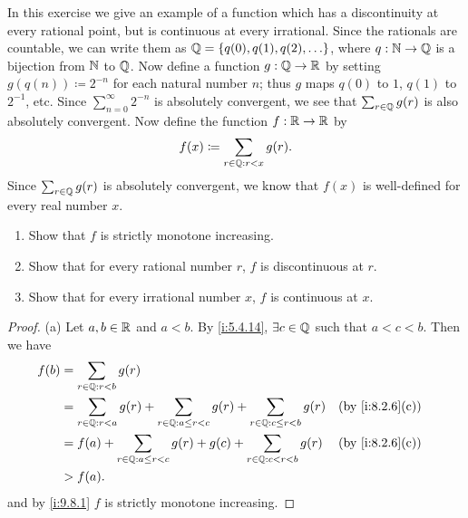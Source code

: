 \begin{ex}\label{i:ex:9.8.5}
  In this exercise we give an example of a function which has a discontinuity at every rational point, but is continuous at every irrational.
  Since the rationals are countable, we can write them as \(\Q = \set{q(0), q(1), q(2), \dots}\), where \(q : \mathbb{N} \to \mathbb{Q}\) is a bijection from \(\mathbb{N}\) to \(\mathbb{Q}\).
  Now define a function \(g : \mathbb{Q} \to \mathbb{R}\) by setting \(g(q(n)) \coloneqq 2^{-n}\) for each natural number \(n\);
  thus \(g\) maps \(q(0)\) to \(1\), \(q(1)\) to \(2^{-1}\), etc.
  Since \(\sum_{n = 0}^\infty 2^{-n}\) is absolutely convergent, we see that \(\sum_{r \in \mathbb{Q}} g(r)\) is also absolutely convergent.
  Now define the function \(f : \mathbb{R} \to \mathbb{R}\) by
  \[
    f(x) \coloneqq \sum_{r \in \mathbb{Q} : r < x} g(r).
  \]
  Since \(\sum_{r \in \mathbb{Q}} g(r)\) is absolutely convergent, we know that \(f(x)\) is well-defined for every real number \(x\).
  \begin{enumerate}
    \item Show that \(f\) is strictly monotone increasing.
    \item Show that for every rational number \(r\), \(f\) is discontinuous at \(r\).
    \item Show that for every irrational number \(x\), \(f\) is continuous at \(x\).
  \end{enumerate}
\end{ex}

\begin{proof}{(a)}
  Let \(a, b \in \mathbb{R}\) and \(a < b\).
  By \cref{i:5.4.14}, \(\exists c \in \mathbb{Q}\) such that \(a < c < b\).
  Then we have
  \begin{align*}
    f(b) & = \sum_{r \in \Q : r < b} g(r)                                                                                                  \\
         & = \sum_{r \in \Q : r < a} g(r) + \sum_{r \in \Q : a \leq r < c} g(r) + \sum_{r \in \Q : c \leq r < b} g(r) &  & \by{i:8.2.6}[c] \\
         & = f(a) + \sum_{r \in \Q : a \leq r < c} g(r) + g(c) + \sum_{r \in \Q : c < r < b} g(r)                     &  & \by{i:8.2.6}[c] \\
         & > f(a).
  \end{align*}
  and by \cref{i:9.8.1} \(f\) is strictly monotone increasing.
\end{proof}

